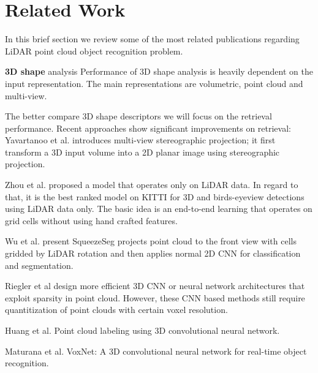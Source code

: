 \section{Related Work}\label{sec:relatedWork}
In this brief section we review some of the most related publications regarding LiDAR point cloud object recognition problem.

\textbf{3D shape} analysis Performance of 3D shape analysis is heavily dependent on the input representation. The main representations are volumetric, point cloud and multi-view.

The better compare 3D shape descriptors we will focus on the retrieval performance. Recent approaches show significant improvements on retrieval: Yavartanoo et al. \cite{DBLP:journals/corr/abs-1811-01571} introduces multi-view stereographic projection; it first transform a 3D input volume into a 2D planar image using stereographic projection.

Zhou et al. \cite{Zhou_2018_CVPR} proposed a model that operates only on LiDAR data. In regard to that, it is the best ranked model on KITTI \cite{geiger2012we} for 3D and birds-eyeview detections using LiDAR data only. The basic idea is an end-to-end learning that operates on grid cells without using hand crafted features.

Wu et al. \cite{DBLP:conf/icra/WuWYK18} present SqueezeSeg projects point cloud to the front view with cells gridded by LiDAR rotation and then applies normal 2D CNN for classification and segmentation.  

Riegler et al \cite{DBLP:conf/cvpr/RieglerUG17} design more efficient 3D CNN or neural network architectures that exploit sparsity in point cloud. However, these CNN based methods still require quantitization of point clouds with certain voxel resolution.





 
Huang et al. \cite{DBLP:conf/icpr/HuangY16}  Point cloud labeling using 3D convolutional neural network. 


Maturana et al. \cite{DBLP:conf/iros/MaturanaS15}  VoxNet: {A} 3D convolutional neural network for real-time object recognition.